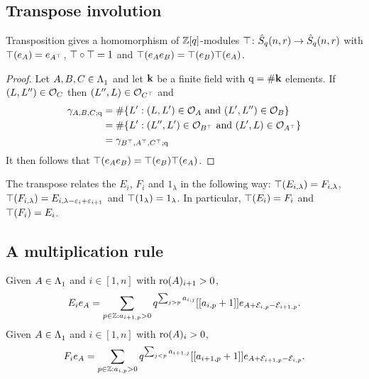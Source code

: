 \documentclass[a4paper, 11pt]{report}
\begin{document}
\subsection{Transpose involution}

\begin{lemma}\label{lemma:transpose-involution}
Transposition gives a homomorphism of $\mathbb{Z}[q]$-modules $\top\colon\hat{S}_q(n,r)\to\hat{S}_q(n,r)$ with $\top(e_A) = e_{A^\top}$, $\top\circ\top = 1$ and $\top(e_A e_B) = \top(e_B)\top(e_A)$.
\end{lemma}
\begin{proof}
Let $A,B,C\in\Lambda_1^{}$ and let $\mathbf{k}$ be a finite field with $\mathrm{q}=\#\mathbf{k}$ elements. If $(L,L'')\in\mathcal{O}_{C}$ then $(L'',L)\in\mathcal{O}_{C^\top}$ and
\begin{align*}
\gamma_{A,B,C;\mathrm{q}}
&= \#\{L': (L,L')\in\mathcal{O}_{A}\text{ and } (L',L'')\in\mathcal{O}_{B}\}\\
&= \#\{L': (L'',L')\in\mathcal{O}_{B^\top}\text{ and } (L',L)\in\mathcal{O}_{A^\top}\}\\
&= \gamma_{B^\top,A^\top, C^\top;\mathrm{q}}
\end{align*}
It then follows that $\top(e_A e_B) = \top(e_B) \top(e_A)$.
\end{proof}

The transpose relates the $E_i$, $F_i$ and $1_\lambda$ in the following way: $\top(E_{i,\lambda}) = F_{i,\lambda}$, $\top(F_{i,\lambda}) = E_{i,\lambda -\varepsilon_i +\varepsilon_{i+1}}$ and $\top(1_\lambda) = 1_\lambda$. In particular, $\top(E_i) = F_i$ and $\top(F_i) = E_i$.

\subsection{A multiplication rule}

\begin{lemma}\label{lemma:fundamental-multiplication-rules}
Given $A\in\Lambda_1^{}$ and $i\in[1,n]$ with $\operatorname{ro}(A)_{i+1}>0$,
\begin{equation*}
E_ie_A = \sum_{p\in\mathbb{Z}:a_{i+1,p}>0} q^{\sum_{j>p}a_{i,j}} [[a_{i,p}+1]] e_{A+\mathcal{E}_{i,p} -\mathcal{E}_{i+1,p}}.
\end{equation*}
Given $A\in\Lambda_1^{}$ and $i\in[1,n]$ with $\operatorname{ro}(A)_i>0$,
\begin{equation*}
F_ie_A = \sum_{p\in\mathbb{Z}:a_{i,p}>0} q^{\sum_{j<p}a_{i+1,j}} [[a_{i+1,p}+1]] e_{A+\mathcal{E}_{i+1,p} -\mathcal{E}_{i,p}}.
\end{equation*}
\end{lemma}
\end{document}
